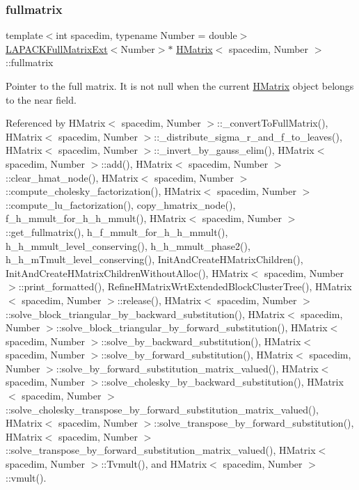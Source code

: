 \mbox{\label{classHMatrix_a328134c9e9cb2c4b05d5431c0ca8a533}} 
\subsubsection{\texorpdfstring{fullmatrix}{fullmatrix}}
{\footnotesize\ttfamily template$<$int spacedim, typename Number = double$>$ \\
\hyperlink{classLAPACKFullMatrixExt}{L\+A\+P\+A\+C\+K\+Full\+Matrix\+Ext}$<$Number$>$$\ast$ \hyperlink{classHMatrix}{H\+Matrix}$<$ spacedim, Number $>$\+::fullmatrix\hspace{0.3cm}{\ttfamily [private]}}

Pointer to the full matrix. It is not null when the current \hyperlink{classHMatrix}{H\+Matrix} object belongs to the near field. 

Referenced by H\+Matrix$<$ spacedim, Number $>$\+::\+\_\+convert\+To\+Full\+Matrix(), H\+Matrix$<$ spacedim, Number $>$\+::\+\_\+distribute\+\_\+sigma\+\_\+r\+\_\+and\+\_\+f\+\_\+to\+\_\+leaves(), H\+Matrix$<$ spacedim, Number $>$\+::\+\_\+invert\+\_\+by\+\_\+gauss\+\_\+elim(), H\+Matrix$<$ spacedim, Number $>$\+::add(), H\+Matrix$<$ spacedim, Number $>$\+::clear\+\_\+hmat\+\_\+node(), H\+Matrix$<$ spacedim, Number $>$\+::compute\+\_\+cholesky\+\_\+factorization(), H\+Matrix$<$ spacedim, Number $>$\+::compute\+\_\+lu\+\_\+factorization(), copy\+\_\+hmatrix\+\_\+node(), f\+\_\+h\+\_\+mmult\+\_\+for\+\_\+h\+\_\+h\+\_\+mmult(), H\+Matrix$<$ spacedim, Number $>$\+::get\+\_\+fullmatrix(), h\+\_\+f\+\_\+mmult\+\_\+for\+\_\+h\+\_\+h\+\_\+mmult(), h\+\_\+h\+\_\+mmult\+\_\+level\+\_\+conserving(), h\+\_\+h\+\_\+mmult\+\_\+phase2(), h\+\_\+h\+\_\+m\+Tmult\+\_\+level\+\_\+conserving(), Init\+And\+Create\+H\+Matrix\+Children(), Init\+And\+Create\+H\+Matrix\+Children\+Without\+Alloc(), H\+Matrix$<$ spacedim, Number $>$\+::print\+\_\+formatted(), Refine\+H\+Matrix\+Wrt\+Extended\+Block\+Cluster\+Tree(), H\+Matrix$<$ spacedim, Number $>$\+::release(), H\+Matrix$<$ spacedim, Number $>$\+::solve\+\_\+block\+\_\+triangular\+\_\+by\+\_\+backward\+\_\+substitution(), H\+Matrix$<$ spacedim, Number $>$\+::solve\+\_\+block\+\_\+triangular\+\_\+by\+\_\+forward\+\_\+substitution(), H\+Matrix$<$ spacedim, Number $>$\+::solve\+\_\+by\+\_\+backward\+\_\+substitution(), H\+Matrix$<$ spacedim, Number $>$\+::solve\+\_\+by\+\_\+forward\+\_\+substitution(), H\+Matrix$<$ spacedim, Number $>$\+::solve\+\_\+by\+\_\+forward\+\_\+substitution\+\_\+matrix\+\_\+valued(), H\+Matrix$<$ spacedim, Number $>$\+::solve\+\_\+cholesky\+\_\+by\+\_\+backward\+\_\+substitution(), H\+Matrix$<$ spacedim, Number $>$\+::solve\+\_\+cholesky\+\_\+transpose\+\_\+by\+\_\+forward\+\_\+substitution\+\_\+matrix\+\_\+valued(), H\+Matrix$<$ spacedim, Number $>$\+::solve\+\_\+transpose\+\_\+by\+\_\+forward\+\_\+substitution(), H\+Matrix$<$ spacedim, Number $>$\+::solve\+\_\+transpose\+\_\+by\+\_\+forward\+\_\+substitution\+\_\+matrix\+\_\+valued(), H\+Matrix$<$ spacedim, Number $>$\+::\+Tvmult(), and H\+Matrix$<$ spacedim, Number $>$\+::vmult().

